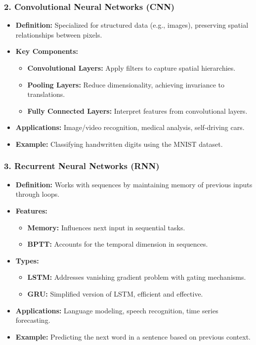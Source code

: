 \documentclass[aspectratio=169]{beamer}
\begin{document}
\begin{frame}[fragile]
    \frametitle{2. Convolutional Neural Networks (CNN)}
    \begin{itemize}
        \item \textbf{Definition:} Specialized for structured data (e.g., images), preserving spatial relationships between pixels.
        \item \textbf{Key Components:}
            \begin{itemize}
                \item \textbf{Convolutional Layers:} Apply filters to capture spatial hierarchies.
                \item \textbf{Pooling Layers:} Reduce dimensionality, achieving invariance to translations.
                \item \textbf{Fully Connected Layers:} Interpret features from convolutional layers.
            \end{itemize}
        \item \textbf{Applications:} Image/video recognition, medical analysis, self-driving cars.
        \item \textbf{Example:} Classifying handwritten digits using the MNIST dataset.
    \end{itemize}
\end{frame}

\begin{frame}[fragile]
    \frametitle{3. Recurrent Neural Networks (RNN)}
    \begin{itemize}
        \item \textbf{Definition:} Works with sequences by maintaining memory of previous inputs through loops.
        \item \textbf{Features:}
            \begin{itemize}
                \item \textbf{Memory:} Influences next input in sequential tasks.
                \item \textbf{BPTT:} Accounts for the temporal dimension in sequences.
            \end{itemize}
        \item \textbf{Types:}
            \begin{itemize}
                \item \textbf{LSTM:} Addresses vanishing gradient problem with gating mechanisms.
                \item \textbf{GRU:} Simplified version of LSTM, efficient and effective.
            \end{itemize}
        \item \textbf{Applications:} Language modeling, speech recognition, time series forecasting.
        \item \textbf{Example:} Predicting the next word in a sentence based on previous context.
    \end{itemize}
\end{frame}
\end{document}

